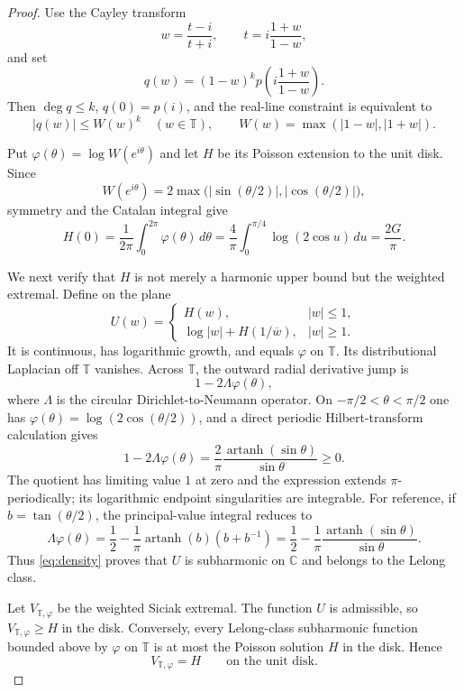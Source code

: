 \documentclass[11pt]{article}
\newcommand{\C}{\mathbb C}
\newcommand{\T}{\mathbb T}
\newcommand{\artanh}{\operatorname{artanh}}
\begin{document}
\begin{proof}
Use the Cayley transform
\[
 w=\frac{t-i}{t+i},\qquad
 t=i\frac{1+w}{1-w},
\]
and set
\[
 q(w)=(1-w)^k p\left(i\frac{1+w}{1-w}\right).
\]
Then $\deg q\le k$, $q(0)=p(i)$, and the real-line constraint is equivalent
to
\begin{equation}\label{eq:circleweight}
 |q(w)|\le W(w)^k\quad(w\in\T),
 \qquad W(w)=\max(|1-w|,|1+w|).
\end{equation}

Put $\varphi(\theta)=\log W(e^{i\theta})$ and let $H$ be its Poisson
extension to the unit disk.  Since
\[
 W(e^{i\theta})=2\max\bigl(|\sin(\theta/2)|,
                               |\cos(\theta/2)|\bigr),
\]
symmetry and the Catalan integral give
\begin{equation}\label{eq:H0}
 H(0)=\frac1{2\pi}\int_0^{2\pi}\varphi(\theta)\,d\theta
 =\frac4\pi\int_0^{\pi/4}\log(2\cos u)\,du
 =\frac{2G}{\pi}.
\end{equation}

We next verify that $H$ is not merely a harmonic upper bound but the
weighted extremal.  Define on the plane
\[
 U(w)=\begin{cases}
 H(w),&|w|\le1,\\
 \log|w|+H(1/\overline w),&|w|\ge1.
 \end{cases}
\]
It is continuous, has logarithmic growth, and equals $\varphi$ on $\T$.
Its distributional Laplacian off $\T$ vanishes.  Across $\T$, the outward
radial derivative jump is
\[
 1-2\Lambda\varphi(\theta),
\]
where $\Lambda$ is the circular Dirichlet-to-Neumann operator.  On
$-\pi/2<\theta<\pi/2$ one has
$\varphi(\theta)=\log(2\cos(\theta/2))$, and a direct periodic
Hilbert-transform calculation gives
\begin{equation}\label{eq:density}
 1-2\Lambda\varphi(\theta)
 =\frac2\pi\frac{\artanh(\sin\theta)}{\sin\theta}\ge0.
\end{equation}
The quotient has limiting value $1$ at zero and the expression extends
$\pi$-periodically; its logarithmic endpoint singularities are integrable.
For reference, if $b=\tan(\theta/2)$, the principal-value integral reduces
to
\[
 \Lambda\varphi(\theta)
 =\frac12-\frac1\pi\artanh(b)(b+b^{-1})
 =\frac12-\frac1\pi\frac{\artanh(\sin\theta)}{\sin\theta}.
\]
Thus \eqref{eq:density} proves that $U$ is subharmonic on $\C$ and belongs
to the Lelong class.

Let $V_{\T,\varphi}$ be the weighted Siciak extremal.  The function $U$ is
admissible, so $V_{\T,\varphi}\ge H$ in the disk.  Conversely, every
Lelong-class subharmonic function bounded above by $\varphi$ on $\T$ is at
most the Poisson solution $H$ in the disk.  Hence
\begin{equation}\label{eq:VeqH}
 V_{\T,\varphi}=H\qquad\text{on the unit disk}.
\end{equation}


\end{proof}
\end{document}
